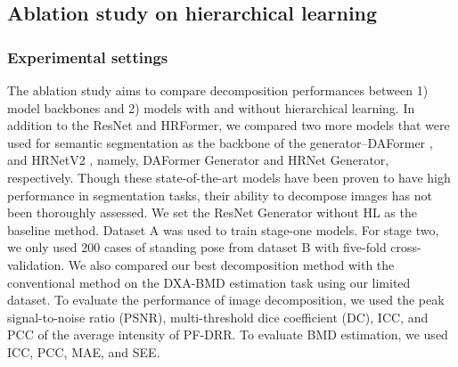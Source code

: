 \documentclass[times,twocolumn,final]{elsarticle}
\begin{document}
\subsection{Ablation study on hierarchical learning}
\label{sec:exp_ablation}
\subsubsection{Experimental settings}The ablation study aims to compare decomposition performances between 1) model backbones and 2) models with and without hierarchical learning. 
In addition to the ResNet and HRFormer, we compared two more models that were used for semantic segmentation as the backbone of the generator--DAFormer \cite{hoyer_daformer_2022}, and HRNetV2 \cite{wang_deep_2021}, namely, DAFormer Generator and HRNet Generator, respectively.
Though these state-of-the-art models have been proven to have high performance in segmentation tasks, their ability to decompose images has not been thoroughly assessed.
We set the ResNet Generator without HL as the baseline method.
Dataset A was used to train stage-one models.
For stage two, we only used 200 cases of standing pose from dataset B with five-fold cross-validation.
We also compared our best decomposition method with the conventional method \cite{hsieh_automated_2021} on the DXA-BMD estimation task using our limited dataset.
To evaluate the performance of image decomposition, we used the peak signal-to-noise ratio (PSNR), multi-threshold dice coefficient (DC), ICC, and PCC of the average intensity of PF-DRR.
To evaluate BMD estimation, we used ICC, PCC, MAE, and SEE.
\end{document}
